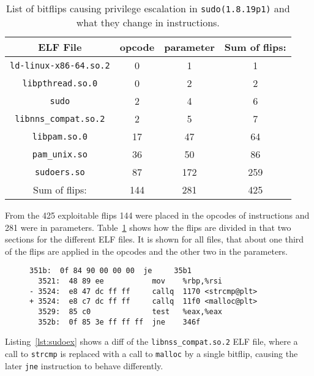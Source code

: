 \begin{table}[!htb]
\centering
\begin{tabular}{c|cc|c}
ELF File & opcode & parameter & Sum of flips: \\ \hline
\texttt{ld-linux-x86-64.so.2} & 0 & 1  & 1    \\
\texttt{libpthread.so.0}      & 0 & 2  & 2    \\
\texttt{sudo}                 & 2 & 4  & 6    \\
\texttt{libnns\_compat.so.2}  & 2 & 5  & 7    \\
\texttt{libpam.so.0}          & 17 & 47   & 64   \\
\texttt{pam\_unix.so}         & 36 & 50   & 86   \\
\texttt{sudoers.so}           & 87 & 172  & 259  \\ \hline
Sum of flips:                 & 144 & 281 & 425
\end{tabular}
\caption{List of bitflips causing privilege escalation in
\texttt{sudo(1.8.19p1)} and what they change in instructions.}
\label{tab:sudoflip}
\end{table}

From the \num{425} exploitable flips \num{144} were placed in the opcodes of
instructions and \num{281} were in parameters. Table~\ref{tab:sudoflip} shows
how the flips are divided in that two sections for the different ELF files. It
is shown for all files, that about one third of the flips are applied in the
opcodes and the other two in the parameters.

\begin{figure}
\begin{minipage}{\linewidth}
\begin{lstlisting}[style=diff,
                   caption={Diff for a bitflip applied to
\texttt{libnss\_compat.so.2} in order to bypass a user privilege check. The call
to \texttt{strcmp} is exchanged because the offset used for the lookuptable
is flipped.},
label=lst:sudoex]
  351b:  0f 84 90 00 00 00  je     35b1
  3521:  48 89 ee           mov    %rbp,%rsi
- 3524:  e8 47 dc ff ff     callq  1170 <strcmp@plt>
+ 3524:  e8 c7 dc ff ff     callq  11f0 <malloc@plt>
  3529:  85 c0              test   %eax,%eax
  352b:  0f 85 3e ff ff ff  jne    346f
\end{lstlisting}
\end{minipage}
\end{figure}

Listing~\ref{lst:sudoex} shows a diff of the \texttt{libnss\_compat.so.2} ELF
file, where a call to \texttt{strcmp} is replaced with a call to \texttt{malloc}
by a single bitflip, causing the later \texttt{jne} instruction to behave
differently.

